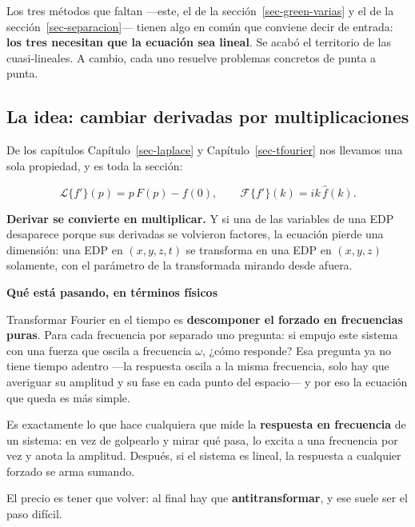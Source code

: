 \documentclass[
  spanish,
  a4paper,
]{scrbook}
\theoremstyle{definition}
\theoremstyle{plain}
\theoremstyle{definition}
\theoremstyle{plain}
\theoremstyle{definition}
\theoremstyle{remark}
\begin{document}
Los tres métodos que faltan ---este, el de la
sección~\ref{sec-green-varias} y el de la
sección~\ref{sec-separacion}--- tienen algo en común que conviene decir
de entrada: \textbf{los tres necesitan que la ecuación sea lineal}. Se
acabó el territorio de las cuasi-lineales. A cambio, cada uno resuelve
problemas concretos de punta a punta.

\subsection{La idea: cambiar derivadas por
multiplicaciones}\label{sec-idea-transformada}

De los capítulos Capítulo~\ref{sec-laplace} y
Capítulo~\ref{sec-tfourier} nos llevamos una sola propiedad, y es toda
la sección:

\[
\mathcal{L}\{f'\}(p) = p\,F(p) - f(0), \qquad
\mathcal{F}\{f'\}(k) = i k\,\hat f(k) .
\]

\textbf{Derivar se convierte en multiplicar.} Y si una de las variables
de una EDP desaparece porque sus derivadas se volvieron factores, la
ecuación pierde una dimensión: una EDP en \((x,y,z,t)\) se transforma en
una EDP en \((x,y,z)\) solamente, con el parámetro de la transformada
mirando desde afuera.

\begin{tcolorbox}[enhanced jigsaw, arc=.35mm, bottomrule=.15mm, breakable, colback=white, colframe=quarto-callout-important-color-frame, left=2mm, leftrule=.75mm, opacityback=0, rightrule=.15mm, toprule=.15mm]
\begin{minipage}[t]{5.5mm}
\textcolor{quarto-callout-important-color}{\faExclamation}
\end{minipage}%
\begin{minipage}[t]{\textwidth - 5.5mm}

\vspace{-3mm}\textbf{Qué está pasando, en términos físicos}\vspace{3mm}

Transformar Fourier en el tiempo es \textbf{descomponer el forzado en
frecuencias puras}. Para cada frecuencia por separado uno pregunta: si
empujo este sistema con una fuerza que oscila a frecuencia \(\omega\),
¿cómo responde? Esa pregunta ya no tiene tiempo adentro ---la respuesta
oscila a la misma frecuencia, solo hay que averiguar su amplitud y su
fase en cada punto del espacio--- y por eso la ecuación que queda es más
simple.

Es exactamente lo que hace cualquiera que mide la \textbf{respuesta en
frecuencia} de un sistema: en vez de golpearlo y mirar qué pasa, lo
excita a una frecuencia por vez y anota la amplitud. Después, si el
sistema es lineal, la respuesta a cualquier forzado se arma sumando.

El precio es tener que volver: al final hay que
\textbf{antitransformar}, y ese suele ser el paso difícil.

\end{minipage}%
\end{tcolorbox}
\end{document}
